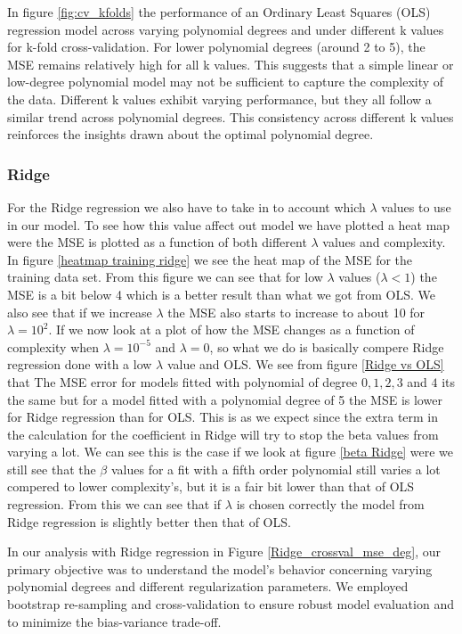 \noindent In figure \ref{fig:cv_kfolds} the performance of an Ordinary Least Squares (OLS) regression model across varying polynomial degrees and under different k values for k-fold cross-validation. For lower polynomial degrees (around 2 to 5), the MSE remains relatively high for all k values. This suggests that a simple linear or low-degree polynomial model may not be sufficient to capture the complexity of the data. Different k values exhibit varying performance, but they all follow a similar trend across polynomial degrees. This consistency across different k values reinforces the insights drawn about the optimal polynomial degree.

\subsubsection{Ridge}
\noindent For the Ridge regression we also have to take in to account which $\lambda$ values to use in our model. To see how this value affect out model we have plotted a heat map were the MSE is plotted as a function of both different $\lambda$ values and complexity. In figure \eqref{heatmap training ridge} we see the heat map of the MSE for the training data set. From this figure we can see that for low $\lambda$ values ($\lambda<1$) the MSE is a bit below 4 which is a better result than what we got from OLS. We also see that if we increase $\lambda$ the MSE also starts to increase to about 10 for $\lambda= 10^{2}$. If we now look at a plot of how the MSE changes as a function of complexity when $\lambda=10^{-5}$ and $\lambda = 0$, so what we do is basically compere Ridge regression done with a low $\lambda$ value and OLS. We see from figure \eqref{Ridge vs OLS} that The MSE error for models fitted with polynomial of degree $0,1,2,3$ and $4$ its the same but for a model fitted with a polynomial degree of 5 the MSE is lower for Ridge regression than for OLS. This is as we expect since the extra term in the calculation for the coefficient in Ridge will try to stop the beta values from varying a lot. We can see this is the case if we look at figure \eqref{beta Ridge} were we still see that the $\beta$ values for a fit with a fifth order polynomial still varies a lot compered to lower complexity's, but it is a fair bit lower than that of OLS regression. From this we can see that if $\lambda$ is chosen correctly the model from Ridge regression is slightly better then that of OLS.

\noindent In our analysis with Ridge regression in Figure \eqref{Ridge_crossval_mse_deg}, our primary objective was to understand the model's behavior concerning varying polynomial degrees and different regularization parameters. We employed bootstrap re-sampling and cross-validation to ensure robust model evaluation and to minimize the bias-variance trade-off.

